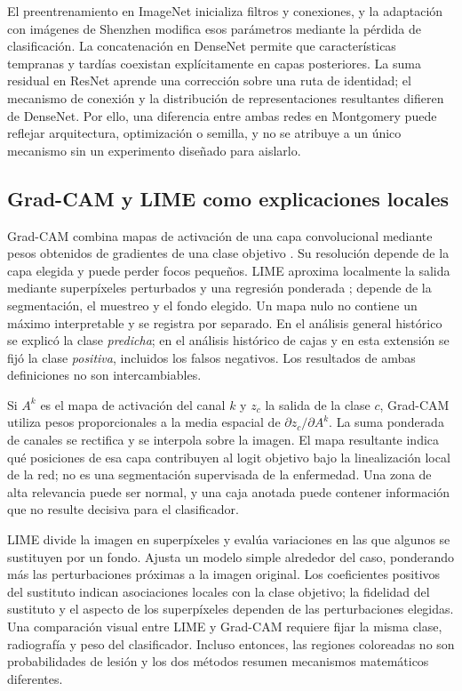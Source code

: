 \documentclass[conference]{IEEEtran}
\begin{document}
El preentrenamiento en ImageNet inicializa filtros y conexiones, y la adaptación con imágenes de Shenzhen modifica esos parámetros mediante la pérdida de clasificación. La concatenación en DenseNet permite que características tempranas y tardías coexistan explícitamente en capas posteriores. La suma residual en ResNet aprende una corrección sobre una ruta de identidad; el mecanismo de conexión y la distribución de representaciones resultantes difieren de DenseNet. Por ello, una diferencia entre ambas redes en Montgomery puede reflejar arquitectura, optimización o semilla, y no se atribuye a un único mecanismo sin un experimento diseñado para aislarlo.

\subsection{Grad-CAM y LIME como explicaciones locales}
Grad-CAM combina mapas de activación de una capa convolucional mediante pesos obtenidos de gradientes de una clase objetivo \cite{selvaraju2017}. Su resolución depende de la capa elegida y puede perder focos pequeños. LIME aproxima localmente la salida mediante superpíxeles perturbados y una regresión ponderada \cite{ribeiro2016}; depende de la segmentación, el muestreo y el fondo elegido. Un mapa nulo no contiene un máximo interpretable y se registra por separado. En el análisis general histórico se explicó la clase \emph{predicha}; en el análisis histórico de cajas y en esta extensión se fijó la clase \emph{positiva}, incluidos los falsos negativos. Los resultados de ambas definiciones no son intercambiables.

Si $A^k$ es el mapa de activación del canal $k$ y $z_c$ la salida de la clase $c$, Grad-CAM utiliza pesos proporcionales a la media espacial de $\partial z_c/\partial A^k$. La suma ponderada de canales se rectifica y se interpola sobre la imagen. El mapa resultante indica qué posiciones de esa capa contribuyen al logit objetivo bajo la linealización local de la red; no es una segmentación supervisada de la enfermedad. Una zona de alta relevancia puede ser normal, y una caja anotada puede contener información que no resulte decisiva para el clasificador.

LIME divide la imagen en superpíxeles y evalúa variaciones en las que algunos se sustituyen por un fondo. Ajusta un modelo simple alrededor del caso, ponderando más las perturbaciones próximas a la imagen original. Los coeficientes positivos del sustituto indican asociaciones locales con la clase objetivo; la fidelidad del sustituto y el aspecto de los superpíxeles dependen de las perturbaciones elegidas. Una comparación visual entre LIME y Grad-CAM requiere fijar la misma clase, radiografía y peso del clasificador. Incluso entonces, las regiones coloreadas no son probabilidades de lesión y los dos métodos resumen mecanismos matemáticos diferentes.
\end{document}
